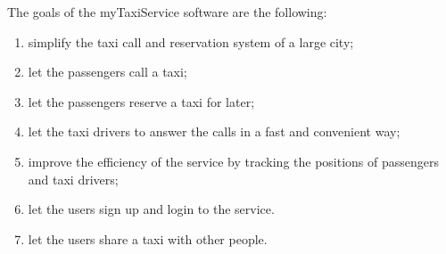 The goals of the myTaxiService software are the following:
\begin{enumerate}
	\item simplify the taxi call and reservation system of a large city; \label{g-simplify}
	\item let the passengers call a taxi;  \label{g-taxicall}
	\item let the passengers reserve a taxi for later;  \label{g-reserve}
	\item let the taxi drivers to answer the calls in a fast and convenient way;  \label{g-notify}
	\item improve the efficiency of the service by tracking the positions of passengers and taxi drivers;  \label{g-position}
	\item let the users sign up and login to the service.  \label{g-login}
	\item let the users share a taxi with other people. \label{g-share}
\end{enumerate}